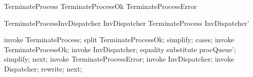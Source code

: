 \begin{zed}
    TerminateProcess  TerminateProcessOk \lor TerminateProcessError
\end{zed}


\begin{theorem}{TerminateProcessInvDispatcher}
    InvDispatcher \land TerminateProcess \implies InvDispatcher'
\end{theorem}

\begin{zproof}[TerminateProcessInvDispatcher]
    invoke TerminateProcess;
    split TerminateProcessOk;
    simplify;
    cases;
    invoke TerminateProcessOk;
    invoke InvDispatcher;
    equality substitute procQueue';
    simplify;
    next;
    invoke TerminateProcessError;
    invoke InvDispatcher;
    invoke \Xi Dispatcher;
    rewrite;
    next;
\end{zproof}